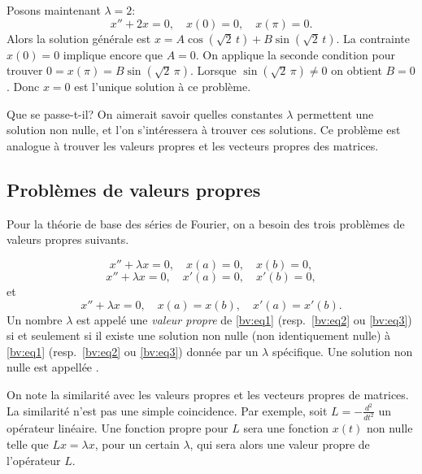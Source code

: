 \begin{example}
Posons maintenant $\lambda = 2$: 
\begin{equation*}
x'' + 2 x = 0, \quad x(0) = 0, \quad x(\pi) = 0.
\end{equation*}
Alors la solution générale est
$x= A \cos ( \sqrt{2}\,t) + B \sin ( \sqrt{2}\,t)$.  La contrainte $x(0) = 0$ implique encore que $A = 0$.  On applique la seconde condition pour trouver 
$0=x(\pi) = B \sin ( \sqrt{2}\,\pi)$.
Lorsque $\sin ( \sqrt{2}\,\pi) \not= 0$ on obtient
$B = 0$.  
Donc $x=0$ est l'unique solution à ce problème.
\end{example}

Que se passe-t-il?  On aimerait savoir quelles constantes  $\lambda$ permettent une solution non nulle, et l'on s'intéressera à trouver ces solutions. Ce problème est analogue  à trouver les valeurs propres et les vecteurs propres des matrices.

\subsection{Problèmes de valeurs propres}

Pour la théorie de base des séries de Fourier, on a besoin
des trois problèmes de valeurs propres suivants. 

\begin{equation} \label{bv:eq1}
x'' + \lambda x = 0, \quad x(a) = 0, \quad x(b) = 0 ,
\end{equation}
\begin{equation} \label{bv:eq2}
x'' + \lambda x = 0, \quad x'(a) = 0, \quad x'(b) = 0 ,
\end{equation}
et
\begin{equation} \label{bv:eq3}
x'' + \lambda x = 0, \quad x(a) = x(b), \quad x'(a) = x'(b) .
\end{equation}
Un nombre $\lambda$ est appelé une
\emph{valeur propre }
de \eqref{bv:eq1}
(resp.\ \eqref{bv:eq2} ou \eqref{bv:eq3}) si et seulement si il existe une solution non nulle (non identiquement nulle) à \eqref{bv:eq1}
(resp.\ \eqref{bv:eq2} ou \eqref{bv:eq3})
donnée par un $\lambda$ spécifique.  Une solution non nulle est appellée 
\emph{}.

On note la similarité avec les valeurs propres et les vecteurs propres de matrices. La similarité n'est pas une simple coincidence.  Par exemple, soit $L = -\frac{d^2}{{dt}^2}$ un opérateur linéaire.  Une fonction propre pour $L$ sera une fonction $x(t)$ non nulle telle que $Lx = \lambda x$, pour un certain $\lambda$, qui sera alors une valeur propre de l'opérateur $L$.

